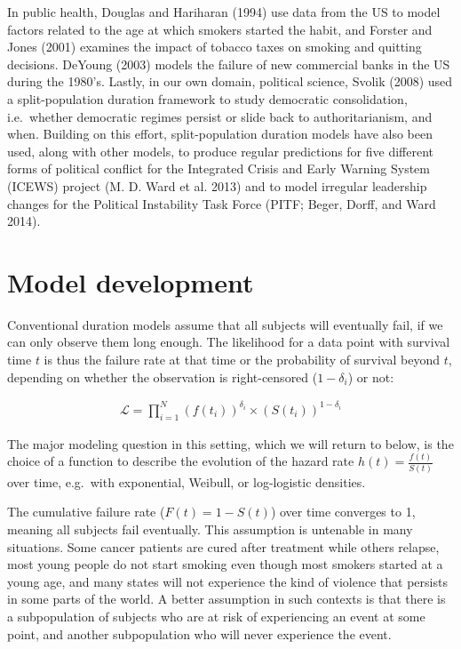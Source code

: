 \documentclass[]{article}
\begin{document}
In public health, Douglas and Hariharan (1994) use data from the US to
model factors related to the age at which smokers started the habit, and
Forster and Jones (2001) examines the impact of tobacco taxes on smoking
and quitting decisions. DeYoung (2003) models the failure of new
commercial banks in the US during the 1980's. Lastly, in our own domain,
political science, Svolik (2008) used a split-population duration
framework to study democratic consolidation, i.e.~whether democratic
regimes persist or slide back to authoritarianism, and when. Building on
this effort, split-population duration models have also been used, along
with other models, to produce regular predictions for five different
forms of political conflict for the Integrated Crisis and Early Warning
System (ICEWS) project (M. D. Ward et al. 2013) and to model irregular
leadership changes for the Political Instability Task Force (PITF;
Beger, Dorff, and Ward 2014).

\section{Model development}\label{model-development}

Conventional duration models assume that all subjects will eventually
fail, if we can only observe them long enough. The likelihood for a data
point with survival time \(t\) is thus the failure rate at that time or
the probability of survival beyond \(t\), depending on whether the
observation is right-censored (\(1-\delta_i\)) or not:

\begin{eqnarray}
\mathcal{L} = \prod_{i=1}^N  \left( f(t_i)\right)^{\delta_i} \times \left( S(t_i) \right)^{1-\delta_i}
\end{eqnarray}

The major modeling question in this setting, which we will return to
below, is the choice of a function to describe the evolution of the
hazard rate \(h(t) = \frac{f(t)}{S(t)}\) over time, e.g.~with
exponential, Weibull, or log-logistic densities.

The cumulative failure rate (\(F(t) = 1 - S(t)\)) over time converges to
1, meaning all subjects fail eventually. This assumption is untenable in
many situations. Some cancer patients are cured after treatment while
others relapse, most young people do not start smoking even though most
smokers started at a young age, and many states will not experience the
kind of violence that persists in some parts of the world. A better
assumption in such contexts is that there is a subpopulation of subjects
who are at risk of experiencing an event at some point, and another
subpopulation who will never experience the event.
\end{document}
